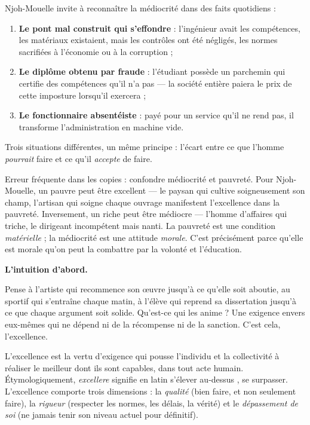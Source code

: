 \documentclass[11pt]{article}
\newcommand{\cle}[1]{{\popxbold\color{popdark}#1}}
\newcounter{popsec}
\newcounter{popsub}
\newcommand{\courssub}[1]{%
  \stepcounter{popsub}%
  \par\vspace{9pt}\noindent{\popxbold\fontsize{11.5}{13}\selectfont\color{popink}{\color{poporange}\thepopsec.\thepopsub}\hspace{6pt}#1}\par\nopagebreak\vspace{4pt}
}
\begin{document}
\begin{exemplebox}
Njoh-Mouelle invite à reconnaître la médiocrité dans des faits quotidiens :
\begin{enumerate}
\item \textbf{Le pont mal construit qui s'effondre} : l'ingénieur avait les compétences, les matériaux existaient, mais les contrôles ont été négligés, les normes sacrifiées à l'économie ou à la corruption ;
\item \textbf{Le diplôme obtenu par fraude} : l'étudiant possède un parchemin qui certifie des compétences qu'il n'a pas — la société entière paiera le prix de cette imposture lorsqu'il exercera ;
\item \textbf{Le fonctionnaire absentéiste} : payé pour un service qu'il ne rend pas, il transforme l'administration en machine vide.
\end{enumerate}
Trois situations différentes, un même principe : l'écart entre ce que l'homme \emph{pourrait} faire et ce qu'il \emph{accepte} de faire.
\end{exemplebox}

\begin{attention}
Erreur fréquente dans les copies : confondre \cle{médiocrité} et \cle{pauvreté}. Pour Njoh-Mouelle, un pauvre peut être excellent — le paysan qui cultive soigneusement son champ, l'artisan qui soigne chaque ouvrage manifestent l'excellence dans la pauvreté. Inversement, un riche peut être médiocre — l'homme d'affaires qui triche, le dirigeant incompétent mais nanti. La pauvreté est une condition \emph{matérielle} ; la médiocrité est une attitude \emph{morale}. C'est précisément parce qu'elle est morale qu'on peut la combattre par la volonté et l'éducation.
\end{attention}

\courssub{L'excellence : la vertu d'exigence}

\textbf{L'intuition d'abord.}\par
Pense à l'artiste qui recommence son œuvre jusqu'à ce qu'elle soit aboutie, au sportif qui s'entraîne chaque matin, à l'élève qui reprend sa dissertation jusqu'à ce que chaque argument soit solide. Qu'est-ce qui les anime ? Une exigence envers eux-mêmes qui ne dépend ni de la récompense ni de la sanction. C'est cela, l'excellence.

\begin{definition}[L'excellence]
L'\cle{excellence} est la vertu d'exigence qui pousse l'individu et la collectivité à réaliser le meilleur dont ils sont capables, dans tout acte humain. Étymologiquement, \emph{excellere} signifie en latin \guillemotleft s'élever au-dessus \guillemotright, se surpasser. L'excellence comporte trois dimensions : la \emph{qualité} (bien faire, et non seulement faire), la \emph{rigueur} (respecter les normes, les délais, la vérité) et le \emph{dépassement de soi} (ne jamais tenir son niveau actuel pour définitif).
\end{definition}
\end{document}
